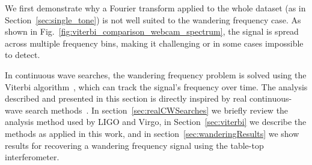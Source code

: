 \documentclass[paper-main.tex]{subfiles}
\begin{document}
We first demonstrate why a Fourier transform applied to the whole dataset (as in Section~\ref{sec:single_tone}) is not well suited to the wandering frequency case.
As shown in Fig.~\ref{fig:viterbi_comparison_webcam_spectrum}, the signal is spread across multiple frequency bins, making it challenging or in some cases impossible to detect.

In continuous wave searches, the wandering frequency problem is solved using the Viterbi algorithm~\cite{Viterbi:1967}, which can track the signal's frequency over time.
The analysis described and presented in this section is directly inspired by real continuous-wave search methods~\cite{SuvorovaEtAl:2016,SuvorovaEtAl:2017}. 
In section~\ref{sec:realCWSearches} we briefly review the analysis method used by LIGO and Virgo, in Section~\ref{sec:viterbi} we describe the methods as applied in this work, and in section~\ref{sec:wanderingResults} we show results for recovering a wandering frequency signal using the table-top interferometer. 
\end{document}
